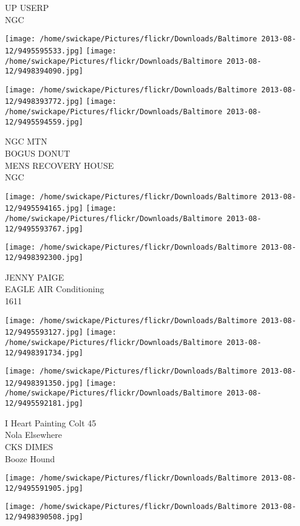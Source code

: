 \documentclass[10pt,letterpaper]{article}
\begin{document}
UP USERP\\
NGC
\pagebreak

\texttt{[image: /home/swickape/Pictures/flickr/Downloads/Baltimore 2013-08-12/9495595533.jpg]}
\texttt{[image: /home/swickape/Pictures/flickr/Downloads/Baltimore 2013-08-12/9498394090.jpg]}

\texttt{[image: /home/swickape/Pictures/flickr/Downloads/Baltimore 2013-08-12/9498393772.jpg]}
\texttt{[image: /home/swickape/Pictures/flickr/Downloads/Baltimore 2013-08-12/9495594559.jpg]}

NGC MTN\\
BOGUS DONUT\\
MENS RECOVERY HOUSE\\
NGC
\pagebreak

\texttt{[image: /home/swickape/Pictures/flickr/Downloads/Baltimore 2013-08-12/9495594165.jpg]}
\texttt{[image: /home/swickape/Pictures/flickr/Downloads/Baltimore 2013-08-12/9495593767.jpg]}

\vspace{0.25in}
\texttt{[image: /home/swickape/Pictures/flickr/Downloads/Baltimore 2013-08-12/9498392300.jpg]}

JENNY PAIGE\\
EAGLE AIR Conditioning\\
1611
\pagebreak

\texttt{[image: /home/swickape/Pictures/flickr/Downloads/Baltimore 2013-08-12/9495593127.jpg]}
\texttt{[image: /home/swickape/Pictures/flickr/Downloads/Baltimore 2013-08-12/9498391734.jpg]}

\texttt{[image: /home/swickape/Pictures/flickr/Downloads/Baltimore 2013-08-12/9498391350.jpg]}
\texttt{[image: /home/swickape/Pictures/flickr/Downloads/Baltimore 2013-08-12/9495592181.jpg]}

I Heart Painting Colt 45\\
Nola Elsewhere\\
CKS DIMES\\
Booze Hound
\pagebreak

\texttt{[image: /home/swickape/Pictures/flickr/Downloads/Baltimore 2013-08-12/9495591905.jpg]}

\vspace{0.25in}
\texttt{[image: /home/swickape/Pictures/flickr/Downloads/Baltimore 2013-08-12/9498390508.jpg]}
\end{document}
